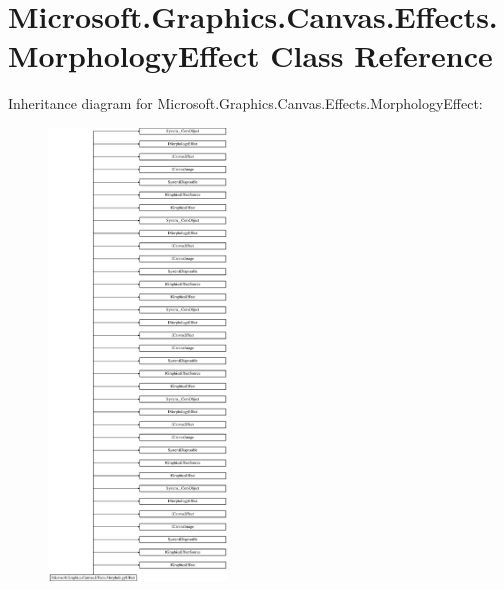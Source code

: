 \hypertarget{class_microsoft_1_1_graphics_1_1_canvas_1_1_effects_1_1_morphology_effect}{}\section{Microsoft.\+Graphics.\+Canvas.\+Effects.\+Morphology\+Effect Class Reference}
\label{class_microsoft_1_1_graphics_1_1_canvas_1_1_effects_1_1_morphology_effect}
Inheritance diagram for Microsoft.\+Graphics.\+Canvas.\+Effects.\+Morphology\+Effect\+:\begin{figure}[H]
\begin{center}
\leavevmode
\includegraphics[height=12.000000cm]{class_microsoft_1_1_graphics_1_1_canvas_1_1_effects_1_1_morphology_effect}
\end{center}
\end{figure}
